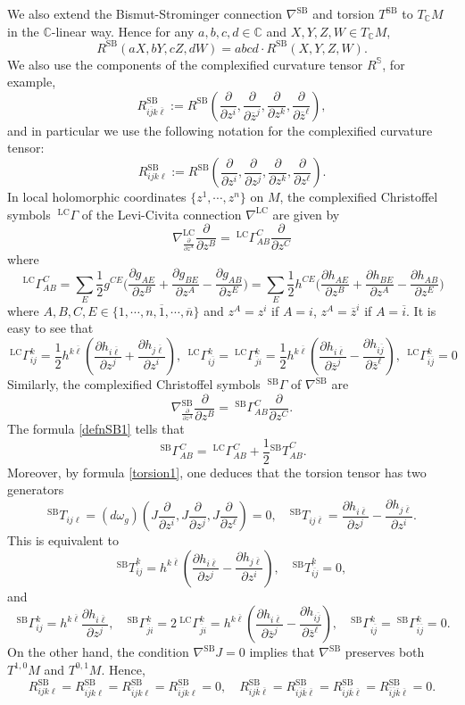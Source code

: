 \documentclass[12pt, reqno]{amsart}
\theoremstyle{plain}
\theoremstyle{definition}
\newcommand{\p}{\partial}
\renewcommand{\bar}{\overline}
\newcommand{\beq}{\begin{equation}}
\newcommand{\eeq}{\end{equation}}
\renewcommand{\S}{{\mathbb S}}
\renewcommand{\>}{\rightarrow}
\newcommand{\C}{{\mathbb C}}
\newcommand{\MS}{\mathrm{SB}}
\newcommand{\MLC}{\mathrm{LC}}
\renewcommand{\>}{\rightarrow}
\renewcommand{\p}{{\partial}}
\numberwithin{equation}{section} %
\begin{document}
We also extend  the
Bismut-Strominger connection $\nabla^\MS$ and torsion $T^\MS$ to $T_{\C}M$ in the $\C$-linear way.
Hence for any $a,b,c,d\in \C$ and $X,Y,Z,W\in T_\C M$,  $$
R^\MS(aX,bY,cZ, dW)=abcd\cdot R^\MS(X,Y,Z,W).$$
We also use the components of the complexified
curvature tensor $R^\S$, for example, $$ R^\MS_{i\bar j k\bar
	\ell}:=R^\MS\left(\frac{\p}{\p z^i}, \frac{\p}{\p \bar z^j},
\frac{\p}{\p z^k}, \frac{\p}{\p \bar z^\ell}\right),$$ and
in particular we use the following notation for the complexified
curvature tensor: $$ R^\MS_{i j k \ell}:=R^\MS\left(\frac{\p}{\p z^i},
\frac{\p}{\p z^j}, \frac{\p}{\p z^k}, \frac{\p}{\p z^\ell}\right).$$
In  local holomorphic coordinates $\{z^1,\cdots, z^n\}$ on $M$,
the complexified Christoffel symbols $\ ^\MLC\Gamma$ of  the Levi-Civita connection $\nabla^\MLC$ are given by
\beq \nabla^\MLC_{\frac{\p}{\p z^A}}\frac{\p}{\p z^B}=\ ^\MLC\Gamma_{AB}^C\frac{\p}{\p z^C}\eeq
where \beq
\ ^\MLC\Gamma_{AB}^C=\sum_{E}\frac{1}{2}g^{CE}\big(\frac{\p g_{AE}}{\p
	z^B}+\frac{\p g_{BE}}{\p z^A}-\frac{\p g_{AB}}{\p
	z^E}\big)=\sum_{E}\frac{1}{2}h^{CE}\big(\frac{\p h_{AE}}{\p
	z^B}+\frac{\p h_{BE}}{\p z^A}-\frac{\p h_{AB}}{\p z^E}\big)
\eeq
where $A,B,C,E\in \{1,\cdots,n,\bar{1},\cdots,\bar{n}\}$ and
$z^{A}=z^{i}$ if $A=i$, $z^{A}=\bar{z}^{i}$ if $A=\bar{i}$.
It is easy to see that
\beq     \ ^\MLC\Gamma_{ij}^k=\frac{1}{2}h^{k\bar\ell}\left(\frac{\p h_{i\bar\ell}}{\p z^j}+\frac{\p h_{j\bar\ell}}{\p z^i}\right), \    \ ^\MLC\Gamma_{i\bar j}^k=\ ^\MLC\Gamma_{\bar j i}^k=\frac{1}{2}h^{k\bar\ell}\left(\frac{\p h_{i\bar\ell}}{\p \bar z^j}-\frac{\p h_{i\bar j}}{\p \bar z^\ell}\right),\  \ ^\MLC\Gamma_{\bar i\bar j}^k=0\eeq
Similarly, the  complexified Christoffel symbols $\ ^\MS\Gamma$ of  $\nabla^\MS$  are
\beq \nabla^\MS_{\frac{\p}{\p z^A}}\frac{\p}{\p z^B}=\ ^\MS\Gamma_{AB}^C\frac{\p}{\p z^C}.\eeq
The formula \eqref{defnSB1} tells that 
\beq \ ^\MS\Gamma_{AB}^C=\ ^\MLC\Gamma_{AB}^C+\frac{1}{2}{^{\MS}T}_{AB}^C.\eeq
Moreover, by  formula \eqref{torsion1}, one deduces that the torsion tensor has two generators
\beq {^{\MS}T}_{ij\ell}=\left(d\omega_g\right)\left(J\frac{\p}{\p z^i}, J\frac{\p}{\p z^j}, J\frac{\p}{\p z^\ell}\right)=0, \quad {^{\MS}T}_{ij\bar \ell}=\frac{\p h_{i\bar{\ell}}}{\p z^j}-\frac{\p h_{j\bar{\ell}}}{\p z^i}. \eeq 
This is equivalent to   \beq    {^{\MS}T}_{ij}^k=h^{k\bar{\ell}}\left(\frac{\p h_{i\bar{\ell}}}{\p z^j}-\frac{\p h_{j\bar{\ell}}}{\p z^i}\right), \quad {^{\MS}T}_{\bar{ij}}^{k}=0,\label{torsionformula} \eeq
and
\beq \ ^\MS\Gamma_{ij}^k=h^{k\bar{\ell}}\frac{\p h_{i\bar{\ell}}}{\p z^j},\quad ^\MS\Gamma_{\bar j i}^k=2\ ^\MLC\Gamma_{\bar j i}^k=h^{k\bar\ell}\left(\frac{\p h_{i\bar\ell}}{\p \bar z^j}-\frac{\p h_{i\bar j}}{\p \bar z^\ell}\right),\quad ^\MS\Gamma_{i\bar j}^k=\ ^\MS\Gamma_{\bar i\bar j}^k=0.\label{Christoffel} \eeq
On the other hand,  the condition $\nabla^\MS J=0$ implies that $\nabla^\MS$ preserves both $T^{1,0}M$ and $T^{0,1}M$. Hence,
\beq R^\MS_{ijk\ell}= R^\MS_{i\bar j k\ell}=R^\MS_{\bar ijk\ell}=R^\MS_{\bar i\bar jk\ell}=0, \quad  R^\MS_{ij\bar k\bar \ell}= R^\MS_{i\bar j \bar k\bar \ell}=R^\MS_{\bar ij\bar k\bar \ell}=R^\MS_{\bar i\bar j\bar k\bar \ell}=0.\label{vanishing}\eeq
\end{document}
